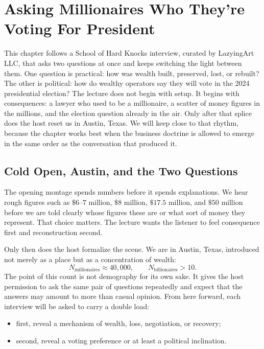 \chapter{Asking Millionaires Who They're Voting For President}

This chapter follows a School of Hard Knocks interview, curated by LazyingArt LLC, that asks two questions at once and keeps switching the light between them. One question is practical: how was wealth built, preserved, lost, or rebuilt? The other is political: how do wealthy operators say they will vote in the 2024 presidential election? The lecture does not begin with setup. It begins with consequences: a lawyer who used to be a millionaire, a scatter of money figures in the millions, and the election question already in the air. Only after that splice does the host reset us in Austin, Texas. We will keep close to that rhythm, because the chapter works best when the business doctrine is allowed to emerge in the same order as the conversation that produced it.

\section{Cold Open, Austin, and the Two Questions}

The opening montage spends numbers before it spends explanations. We hear rough figures such as \(\$6\text{--}7\) million, \(\$8\) million, \(\$17.5\) million, and \(\$50\) million before we are told clearly whose figures these are or what sort of money they represent. That choice matters. The lecture wants the listener to feel consequence first and reconstruction second.

Only then does the host formalize the scene. We are in Austin, Texas, introduced not merely as a place but as a concentration of wealth:
\begin{equation}
N_{\text{millionaires}} \approx 40{,}000,\qquad
N_{\text{billionaires}} > 10.
\end{equation}
The point of this count is not demography for its own sake. It gives the host permission to ask the same pair of questions repeatedly and expect that the answers may amount to more than casual opinion. From here forward, each interview will be asked to carry a double load:
\begin{itemize}
\item first, reveal a mechanism of wealth, loss, negotiation, or recovery;
\item second, reveal a voting preference or at least a political inclination.
\end{itemize}

